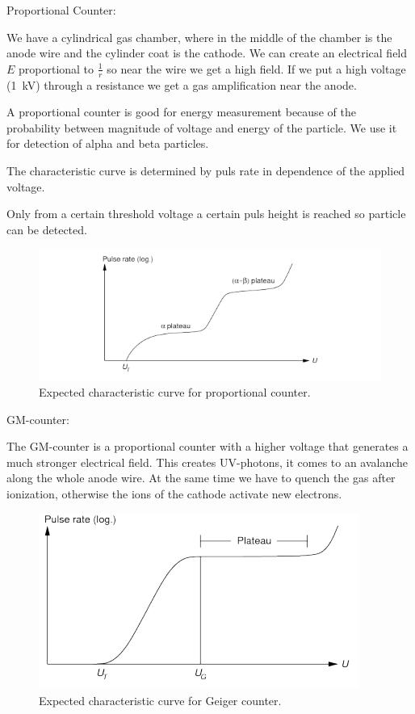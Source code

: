 Proportional Counter:

We have a cylindrical gas chamber, where in the middle of the chamber is the anode wire and the cylinder coat is the cathode.
We can create an electrical field $E$ proportional to $\frac{1}{r}$ so near the wire we get a high field.
If we put a high voltage (\SI{1}{kV}) through a resistance we get a gas amplification near the anode.

A proportional counter is good for energy measurement because of the probability between magnitude of voltage and energy of the particle.
We use it for detection of alpha and beta particles.

The characteristic curve is determined by puls rate in dependence of the applied voltage.

Only from a certain threshold voltage a certain puls height is reached so particle can be detected.

\begin{figure}[H]
\centering
\includegraphics[width=\textwidth]{../Figures/prop.PNG}
\caption{Expected characteristic curve for proportional counter.}
\label{fig:Proportional}
\end{figure}


GM-counter:

The GM-counter is a proportional counter with a higher voltage that generates a much stronger electrical field.
This creates UV-photons, it comes to an avalanche along the whole anode wire.
At the same time we have to quench the gas after ionization, otherwise the ions of the cathode activate new electrons.

\begin{figure}[H]
\centering
\includegraphics[width=\textwidth]{../Figures/Geiger.PNG}
\caption{Expected characteristic curve for Geiger counter.}
\label{fig:Geiger}
\end{figure}

